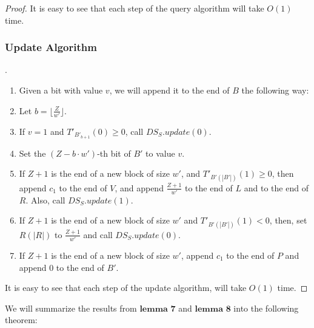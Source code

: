 \documentclass[runningheads]{llncs}
\begin{document}
\begin{proof}
    It is easy to see that each step of the query algorithm will take $O(1)$ time.


    \subsubsection{Update Algorithm}.
    \begin{enumerate}
        \item[] Given a bit with value $v$, we will append it to the end of $B$ the following way:
        \item Let $b=\lfloor \frac{Z}{w'} \rfloor$.
        \item If $v=1$ and $T'_{B'_{b+1}}(0)\geq 0$, call $DS_{S}.update(0)$.
        \item Set the $(Z-b\cdot w')$-th bit of $B'$ to value $v$.
        \item If $Z+1$ is the end of a new block of size $w'$, and $T'_{B'(|B'|)}(1)\geq 0$, 
        then append $c_1$ to the end of $V$, and append $\frac{Z+1}{w'}$ to the end of $L$ and to the end of $R$.
        Also, call $DS_{S}.update(1)$.

        \item If $Z+1$ is the end of a new block of size $w'$ and $T'_{B'(|B'|)}(1) < 0$,
        then, set $R(|R|)$ to $\frac{Z+1}{w'}$ and call $DS_{S}.update(0)$.

        \item If $Z+1$ is the end of a new block of size $w'$, append $c_1$ to the end of $P$ 
        and append $0$ to the end of $B'$.
        
    \end{enumerate}

    It is easy to see that each step of the update algorithm, will take $O(1)$ time.

\end{proof}

We will summarize the results from $\textbf{lemma 7}$ and $\textbf{lemma 8}$ into the following theorem:
\end{document}
